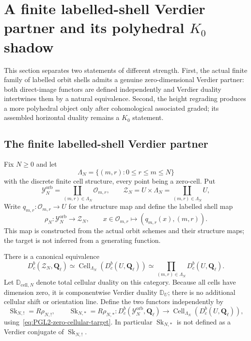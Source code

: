 \documentclass[11pt]{article}
\theoremstyle{definition}
\theoremstyle{remark}
\newcommand{\Qell}{\mathbf Q_\ell}
\newcommand{\D}{\mathbb D}
\newcommand{\Cell}{\operatorname{Cell}}
\newcommand{\Sk}{\operatorname{Sk}}
\begin{document}
\section{A finite labelled-shell Verdier partner and its polyhedral
\texorpdfstring{$K_0$}{K0} shadow}
\label{sec:PGL2-narrow-skeletonization}

This section separates two statements of different strength.  First, the
actual finite family of labelled orbit shells admits a genuine
zero-dimensional Verdier partner: both direct-image functors are defined
independently and Verdier duality intertwines them by a natural equivalence.
Second, the height regrading produces a more polyhedral object only after
cohomological associated graded; its assembled horizontal duality remains a
$K_0$ statement.

\subsection{The finite labelled-shell Verdier partner}

Fix $N\ge0$ and let
\begin{equation}
 \Lambda_N=\{(m,r):0\le r\le m\le N\}
 \label{eq:PGL2-finite-shell-index-set}
\end{equation}
with the discrete finite cell structure, every point being a zero-cell.  Put
\begin{equation}
 \mathscr Y_N^{\mathrm{orb}}
 =\coprod_{(m,r)\in\Lambda_N}\mathscr O_{m,r},
 \qquad
 \mathscr Z_N=U\times\Lambda_N
 =\coprod_{(m,r)\in\Lambda_N}U,
 \label{eq:PGL2-finite-shell-source-target}
\end{equation}
Write $q_{m,r}:\mathscr O_{m,r}\to U$ for the structure map and define the
labelled shell map
\begin{equation}
 \rho_N:\mathscr Y_N^{\mathrm{orb}}\longrightarrow\mathscr Z_N,
 \qquad
 x\in\mathscr O_{m,r}\longmapsto(q_{m,r}(x),(m,r)).
 \label{eq:PGL2-labelled-shell-map}
\end{equation}
This map is constructed from the actual orbit schemes and their structure
maps; the target is not inferred from a generating function.

There is a canonical equivalence
\begin{equation}
 D_c^b(\mathscr Z_N,\Qell)
 \simeq
 \Cell_{\Lambda_N}(D_c^b(U,\Qell))
 \simeq
 \prod_{(m,r)\in\Lambda_N}D_c^b(U,\Qell).
 \label{eq:PGL2-zero-cellular-target}
\end{equation}
Let $\D_{\mathrm{cell},N}$ denote total cellular duality on this category.
Because all cells have dimension zero, it is componentwise Verdier duality
$\D_U$; there is no additional cellular shift or orientation line.  Define
the two functors independently by
\begin{equation}
 \Sk_{N,!}=R\rho_{N,!},\qquad
 \Sk_{N,*}=R\rho_{N,*}:
 D_c^b(\mathscr Y_N^{\mathrm{orb}},\Qell)
 \longrightarrow
 \Cell_{\Lambda_N}(D_c^b(U,\Qell)),
 \label{eq:PGL2-genuine-Sk-pair}
\end{equation}
using~\eqref{eq:PGL2-zero-cellular-target}.  In particular $\Sk_{N,*}$ is
not defined as a Verdier conjugate of $\Sk_{N,!}$.
\end{document}
